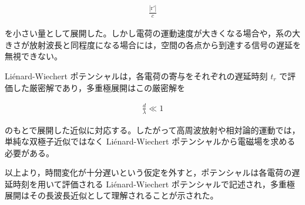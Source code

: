 \documentclass[platex,dvipdfmx,a4paper]{jsarticle}
\newcommand{\vect}[1]{\boldsymbol{\mathrm{#1}}}
\begin{document}
\begin{align*}
\frac{|\vect{r}'|}{c}
\end{align*}

を小さい量として展開した。しかし電荷の運動速度が大きくなる場合や，系の大きさが放射波長と同程度になる場合には，空間の各点から到達する信号の遅延を無視できない。

Liénard-Wiechert ポテンシャルは，各電荷の寄与をそれぞれの遅延時刻 $t_r$ で評価した厳密解であり，多重極展開はこの厳密解を

\begin{align*}
\frac{d}{\lambda}\ll 1
\end{align*}

のもとで展開した近似に対応する。したがって高周波放射や相対論的運動では，単純な双極子近似ではなく Liénard-Wiechert ポテンシャルから電磁場を求める必要がある。

以上より，時間変化が十分遅いという仮定を外すと，ポテンシャルは各電荷の遅延時刻を用いて評価される Liénard-Wiechert ポテンシャルで記述され，多重極展開はその長波長近似として理解されることが示された。
\end{document}
